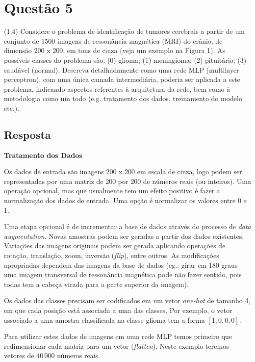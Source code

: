 \documentclass[final,3p]{elsarticle}
\numberwithin{equation}{section}
\begin{document}
\section{Questão 5}

    (1,4) Considere o problema de identificação de tumores cerebrais a partir de um conjunto de 1500 imagens de ressonância magnética (MRI) do crânio, de dimensão 200 x 200, em tons de cinza (veja um exemplo na Figura 1).
    As possíveis classes do problema são: (0) glioma; (1) meningioma; (2) pituitário; (3) saudável (normal). Descreva detalhadamente como uma rede MLP (multilayer perceptron), com uma única camada intermediária, poderia ser aplicada a este problema, indicando aspectos referentes à arquitetura da rede, bem como à metodologia como um todo (e.g. tratamento dos dados, treinamento do modelo etc.).

    \subsection{Resposta}

        \noindent \textbf{Tratamento dos Dados}

        Os dados de entrada são imagens 200 x 200 em escala de cinza, logo podem ser representadas por uma matriz de 200 por 200 de números reais (ou inteiros). Uma operação opcional, mas que usualmente tem um efeito positivo é fazer a normalização dos dados de entrada. Uma opção é normalizar os valores entre 0 e 1.

        Uma etapa opcional é de incrementar a base de dados através do processo de \emph{data augmentation}. Novas amostras podem ser geradas a partir dos dados existentes. Variações das imagens originais podem ser gerada aplicando operações de rotação, translação, zoom, inversão (\emph{flip}), entre outros. As modificações apropriadas dependem das imagens da base de dados (eg.: girar em 180 graus uma imagem transversal de ressonância magnética pode não fazer sentido, pois todas tem a cabeça virada para a parte superior da imagem).

        Os dados das classes precisam ser codificados em um vetor \emph{one-hot} de tamanho 4, em que cada posição está associada a uma das classes. Por exemplo, o vetor associado a uma amostra classificada na classe glioma tem a forma $[1,0,0,0]$.

        Para utilizar estes dados de imagens em uma rede MLP temos primeiro que redimensionar cada matriz para um vetor (\emph{flatten}). Neste exemplo teremos vetores de $40\,000$ números reais.
\end{document}
